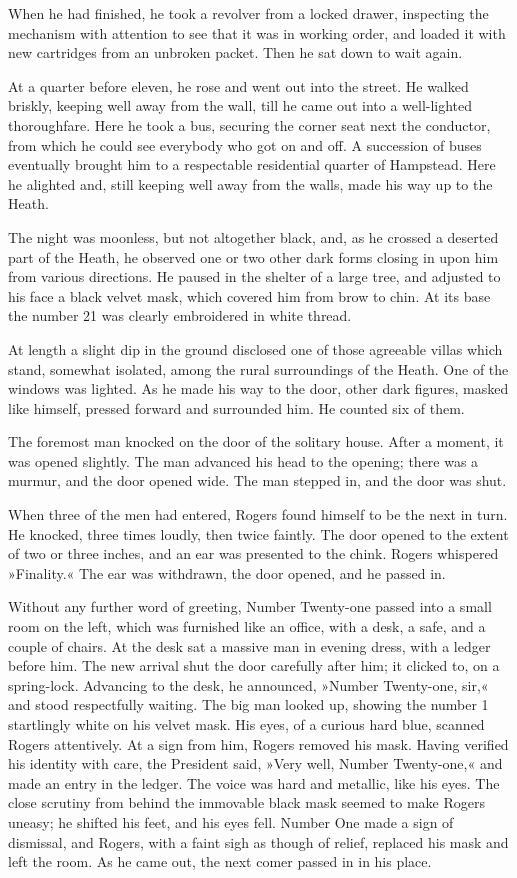 When he had finished, he took a revolver from a locked drawer, inspecting the mechanism with attention to see that it was in working order, and loaded it with new cartridges from an unbroken packet. Then he sat down to wait again.

At a quarter before eleven, he rose and went out into the street. He walked briskly, keeping well away from the wall, till he came out into a well-lighted thoroughfare. Here he took a bus, securing the corner seat next the conductor, from which he could see everybody who got on and off. A succession of buses eventually brought him to a respectable residential quarter of Hampstead. Here he alighted and, still keeping well away from the walls, made his way up to the Heath.

The night was moonless, but not altogether black, and, as he crossed a deserted part of the Heath, he observed one or two other dark forms closing in upon him from various directions. He paused in the shelter of a large tree, and adjusted to his face a black velvet mask, which covered him from brow to chin. At its base the number 21 was clearly embroidered in white thread.

At length a slight dip in the ground disclosed one of those agreeable villas which stand, somewhat isolated, among the rural surroundings of the Heath. One of the windows was lighted. As he made his way to the door, other dark figures, masked like himself, pressed forward and surrounded him. He counted six of them.

The foremost man knocked on the door of the solitary house. After a moment, it was opened slightly. The man advanced his head to the opening; there was a murmur, and the door opened wide. The man stepped in, and the door was shut.

When three of the men had entered, Rogers found himself to be the next in turn. He knocked, three times loudly, then twice faintly. The door opened to the extent of two or three inches, and an ear was presented to the chink. Rogers whispered »Finality.« The ear was withdrawn, the door opened, and he passed in.

Without any further word of greeting, Number Twenty-one passed into a small room on the left, which was furnished like an office, with a desk, a safe, and a couple of chairs. At the desk sat a massive man in evening dress, with a ledger before him. The new arrival shut the door carefully after him; it clicked to, on a spring-lock. Advancing to the desk, he announced, »Number Twenty-one, sir,« and stood respectfully waiting. The big man looked up, showing the number 1 startlingly white on his velvet mask. His eyes, of a curious hard blue, scanned Rogers attentively. At a sign from him, Rogers removed his mask. Having verified his identity with care, the President said, »Very well, Number Twenty-one,« and made an entry in the ledger. The voice was hard and metallic, like his eyes. The close scrutiny from behind the immovable black mask seemed to make Rogers uneasy; he shifted his feet, and his eyes fell. Number One made a sign of dismissal, and Rogers, with a faint sigh as though of relief, replaced his mask and left the room. As he came out, the next comer passed in in his place.

